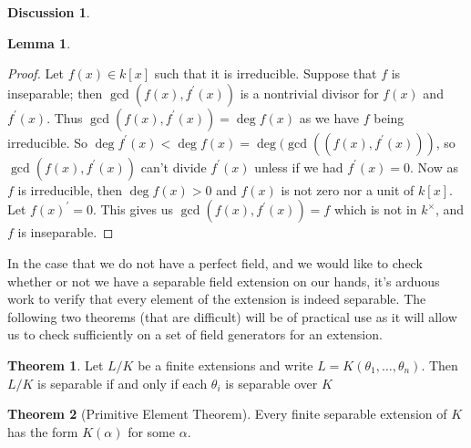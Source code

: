 \documentclass[oneside]{amsart}
\theoremstyle{definition}
\newtheorem{theorem}{Theorem}[section]
\newtheorem{lemma}{Lemma}[section]
\newtheorem{disc}{Discussion}[section]
\begin{document}
\begin{disc}
\begin{lemma}
\end{lemma}
\begin{proof}
	Let $f(x) \in k[x]$ such that it is irreducible. Suppose that $f$ is inseparable; then $\gcd (f(x), f^\prime (x))$ is a nontrivial divisor for $f(x)$ and $f^\prime (x)$. Thus $\gcd (f(x), f^\prime(x)) = \deg f(x)$ as we have $f$ being irreducible. So $\deg f^\prime(x) < \deg f(x) = \deg (\gcd ((f(x), f^\prime(x)))$, so $\gcd (f(x), f^\prime(x))$ can't divide $f^\prime (x)$ unless if we had $f^\prime (x) = 0$. Now as $f$ is irreducible, then $\deg f(x) > 0$ and $f(x)$ is not zero nor a unit of $k[x]$. Let $f (x) ^\prime = 0$. This gives us $\gcd (f(x), f^\prime (x)) = f$ which is not in $k^\times$, and $f$ is inseparable. 
\end{proof}

 In the case that we do not have a perfect field, and we would like to check whether or not we have a separable field extension on our hands, it's arduous work to verify that every element of the extension is indeed separable. The following two theorems (that are difficult) will be of practical use as it will allow us to check sufficiently on a set of field generators for an extension. 
\begin{theorem} Let $L/K$ be a finite extensions and write $L=K(\theta_1, \ldots, \theta_n)$. Then $L/K$ is separable if and only if each $\theta_i$ is separable over $K$
\end{theorem}
\begin{theorem}[Primitive Element Theorem] Every finite separable extension of $K$ has the form $K(\alpha)$ for some $\alpha$.
\end{theorem}
\end{disc}
\end{document}
